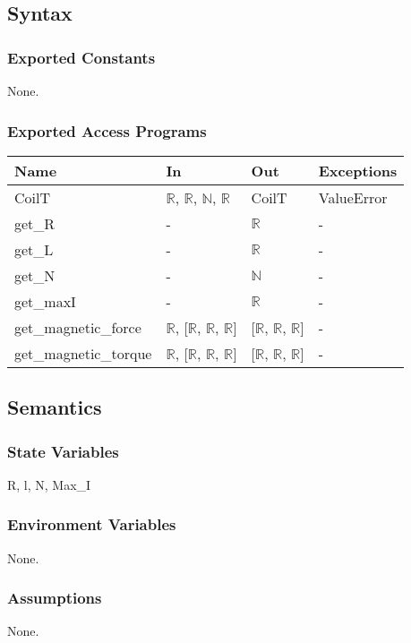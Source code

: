 \documentclass[12pt, titlepage]{article}
\begin{document}
\subsection{Syntax}

\subsubsection{Exported Constants}
None.
\subsubsection{Exported Access Programs}

\begin{center}
\begin{tabular}{p{4cm} p{4cm} p{4cm} p{2cm}}
\hline
\textbf{Name} & \textbf{In} & \textbf{Out} & \textbf{Exceptions} \\
\hline
CoilT & $\mathbb{R}$, $\mathbb{R}$, $\mathbb{N}$, $\mathbb{R}$ & CoilT  & ValueError \\
\hline
get\_R & - & $\mathbb{R}$  & -  \\
\hline
get\_L & - & $\mathbb{R}$  & -  \\
\hline
get\_N & - & $\mathbb{N}$  & -  \\
\hline
get\_maxI & - & $\mathbb{R}$  & -  \\
\hline
get\_magnetic\_force & $\mathbb{R}$, [$\mathbb{R}$, $\mathbb{R}$, $\mathbb{R}$] & [$\mathbb{R}$, $\mathbb{R}$, $\mathbb{R}$]  & -  \\
\hline
get\_magnetic\_torque & $\mathbb{R}$, [$\mathbb{R}$, $\mathbb{R}$, $\mathbb{R}$] & [$\mathbb{R}$, $\mathbb{R}$, $\mathbb{R}$]  & -  \\
\hline
\end{tabular}
\end{center}

\subsection{Semantics}

\subsubsection{State Variables}
R, l, N, Max\_I
\subsubsection{Environment Variables}
None.
\subsubsection{Assumptions}
None.
\end{document}
